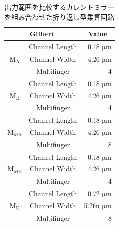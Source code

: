        \begin{table}[!b]
            \centering
            \caption{出力範囲を比較するカレントミラーを組み合わせた折り返し型乗算回路}
            \label{table:3_folded_mirror_com_param}
            \begin{tabular}{c|c|r}
                    \hline
                    \multicolumn{2}{c}{Gilbert}   & \multicolumn{1}{c}{Value}     \\
                    \hline\hline
                    &   Channel Length   &   0.18 $\mathrm{\mu m}$   \\
                    \cline{2-3}
                    $\mathrm{M_{A}}$   &   Channel Width   &   4.26 $\mathrm{\mu m}$   \\
                    \cline{2-3}
                        &   Multifinger   & 4    \\
                    \hline
                    &   Channel Length   &   0.18 $\mathrm{\mu m}$   \\
                    \cline{2-3}
                    $\mathrm{M_{B}}$   &   Channel Width   &   4.26 $\mathrm{\mu m}$   \\
                    \cline{2-3}
                        &   Multifinger   & 4    \\
                    \hline
                    &   Channel Length   &   0.18 $\mathrm{\mu m}$   \\
                    \cline{2-3}
                    $\mathrm{M_{MA}}$   &   Channel Width   &   4.26 $\mathrm{\mu m}$   \\
                    \cline{2-3}
                        &   Multifinger   & 8    \\
                    \hline
                    &   Channel Length   &   0.18 $\mathrm{\mu m}$   \\
                    \cline{2-3}
                    $\mathrm{M_{MB}}$   &   Channel Width   &   4.26 $\mathrm{\mu m}$   \\
                    \cline{2-3}
                        &   Multifinger   & 4    \\
                    \hline
                    &   Channel Length   &   0.72 $\mathrm{\mu m}$   \\
                    \cline{2-3}
                    $\mathrm{M_{U}}$   &   Channel Width   &   5.26u $\mathrm{\mu m}$   \\
                    \cline{2-3}
                        &   Multifinger   & 8    \\
                    \hline

\end{tabular}
\end{table}
